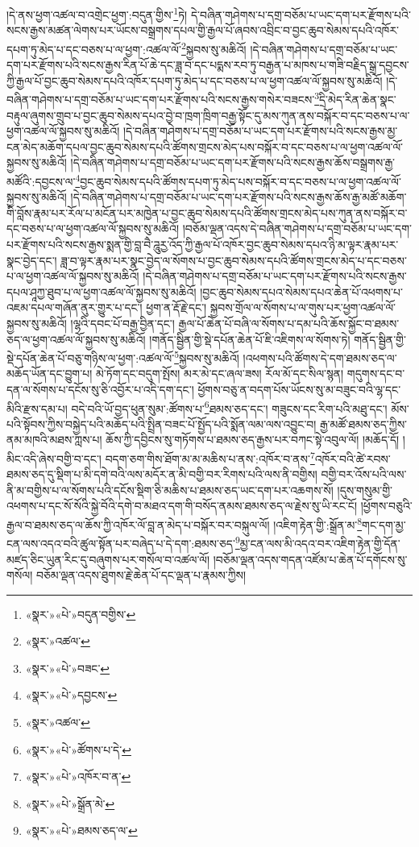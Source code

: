།དེ་ནས་ཕྱག་འཚལ་བ་འགྲེང་ཕྱག་:བདུན་གྱིས་\footnote{«སྣར་»«པེ་»བདུན་བགྱིས་}ཏེ། དེ་བཞིན་གཤེགས་པ་དགྲ་བཅོམ་པ་ཡང་དག་པར་རྫོགས་པའི་སངས་རྒྱས་མཚན་ལེགས་པར་ཡོངས་བསྒྲགས་དཔལ་གྱི་རྒྱལ་པོ་ཞབས་འབྲིང་བ་བྱང་ཆུབ་སེམས་དཔའི་འཁོར་དཔག་ཏུ་མེད་པ་དང་བཅས་པ་ལ་ཕྱག་:འཚལ་ལོ་\footnote{«སྣར་»འཚལ་}སྐྱབས་སུ་མཆིའོ། །དེ་བཞིན་གཤེགས་པ་དགྲ་བཅོམ་པ་ཡང་དག་པར་རྫོགས་པའི་སངས་རྒྱས་རིན་པོ་ཆེ་དང་ཟླ་བ་དང་པདྨས་རབ་ཏུ་བརྒྱན་པ་མཁས་པ་གཟི་བརྗིད་སྒྲ་དབྱངས་ཀྱི་རྒྱལ་པོ་བྱང་ཆུབ་སེམས་དཔའི་འཁོར་དཔག་ཏུ་མེད་པ་དང་བཅས་པ་ལ་ཕྱག་འཚལ་ལོ་སྐྱབས་སུ་མཆིའོ། །དེ་བཞིན་གཤེགས་པ་དགྲ་བཅོམ་པ་ཡང་དག་པར་རྫོགས་པའི་སངས་རྒྱས་གསེར་བཟངས་\footnote{«སྣར་»«པེ་»བཟང་}དྲི་མེད་རིན་ཆེན་སྣང་བརྟུལ་ཞུགས་གྲུབ་པ་བྱང་ཆུབ་སེམས་དཔའ་བྱེ་བ་ཁྲག་ཁྲིག་བརྒྱ་སྟོང་དུ་མས་ཀུན་ནས་བསྐོར་བ་དང་བཅས་པ་ལ་ཕྱག་འཚལ་ལོ་སྐྱབས་སུ་མཆིའོ། །དེ་བཞིན་གཤེགས་པ་དགྲ་བཅོམ་པ་ཡང་དག་པར་རྫོགས་པའི་སངས་རྒྱས་མྱ་ངན་མེད་མཆོག་དཔལ་བྱང་ཆུབ་སེམས་དཔའི་ཚོགས་གྲངས་མེད་པས་བསྐོར་བ་དང་བཅས་པ་ལ་ཕྱག་འཚལ་ལོ་སྐྱབས་སུ་མཆིའོ། །དེ་བཞིན་གཤེགས་པ་དགྲ་བཅོམ་པ་ཡང་དག་པར་རྫོགས་པའི་སངས་རྒྱས་ཆོས་བསྒྲགས་རྒྱ་མཚོའི་:དབྱངས་ལ་\footnote{«སྣར་»«པེ་»དབྱངས་}བྱང་ཆུབ་སེམས་དཔའི་ཚོགས་དཔག་ཏུ་མེད་པས་བསྐོར་བ་དང་བཅས་པ་ལ་ཕྱག་འཚལ་ལོ་སྐྱབས་སུ་མཆིའོ། །དེ་བཞིན་གཤེགས་པ་དགྲ་བཅོམ་པ་ཡང་དག་པར་རྫོགས་པའི་སངས་རྒྱས་ཆོས་རྒྱ་མཚོ་མཆོག་གི་བློས་རྣམ་པར་རོལ་པ་མངོན་པར་མཁྱེན་པ་བྱང་ཆུབ་སེམས་དཔའི་ཚོགས་གྲངས་མེད་པས་ཀུན་ནས་བསྐོར་བ་དང་བཅས་པ་ལ་ཕྱག་འཚལ་ལོ་སྐྱབས་སུ་མཆིའོ། །བཅོམ་ལྡན་འདས་དེ་བཞིན་གཤེགས་པ་དགྲ་བཅོམ་པ་ཡང་དག་པར་རྫོགས་པའི་སངས་རྒྱས་སྨན་གྱི་བླ་བཻ་ཌཱུརྱ་འོད་ཀྱི་རྒྱལ་པོ་འཁོར་བྱང་ཆུབ་སེམས་དཔའ་ཉི་མ་ལྟར་རྣམ་པར་སྣང་བྱེད་དང་། ཟླ་བ་ལྟར་རྣམ་པར་སྣང་བྱེད་ལ་སོགས་པ་བྱང་ཆུབ་སེམས་དཔའི་ཚོགས་གྲངས་མེད་པ་དང་བཅས་པ་ལ་ཕྱག་འཚལ་ལོ་སྐྱབས་སུ་མཆིའོ། །དེ་བཞིན་གཤེགས་པ་དགྲ་བཅོམ་པ་ཡང་དག་པར་རྫོགས་པའི་སངས་རྒྱས་དཔལ་ཤཱཀྱ་ཐུབ་པ་ལ་ཕྱག་འཚལ་ལོ་སྐྱབས་སུ་མཆིའོ། །བྱང་ཆུབ་སེམས་དཔའ་སེམས་དཔའ་ཆེན་པོ་འཕགས་པ་འཇམ་དཔལ་གཞོན་ནུར་གྱུར་པ་དང་། ཕྱག་ན་རྡོ་རྗེ་དང་། སྐྱབས་གྲོལ་ལ་སོགས་པ་ལ་གུས་པར་ཕྱག་འཚལ་ལོ་སྐྱབས་སུ་མཆིའོ། །ལྷའི་དབང་པོ་བརྒྱ་བྱིན་དང་། རྒྱལ་པོ་ཆེན་པོ་བཞི་ལ་སོགས་པ་དམ་པའི་ཆོས་སྐྱོང་བ་ཐམས་ཅད་ལ་ཕྱག་འཚལ་ལོ་སྐྱབས་སུ་མཆིའོ། །གནོད་སྦྱིན་གྱི་སྡེ་དཔོན་ཆེན་པོ་ཇི་འཇིགས་ལ་སོགས་ཏེ། གནོད་སྦྱིན་གྱི་སྡེ་དཔོན་ཆེན་པོ་བཅུ་གཉིས་ལ་ཕྱག་:འཚལ་ལོ་\footnote{«སྣར་»འཚལ་}སྐྱབས་སུ་མཆིའོ། །འཕགས་པའི་ཚོགས་དེ་དག་ཐམས་ཅད་ལ་མཆོད་ཡོན་དང་བྱུག་པ། མེ་ཏོག་དང་བདུག་སྤོས། མར་མེ་དང་ཞལ་ཟས། རོལ་མོ་དང་སིལ་སྙན། གདུགས་དང་བ་དན་ལ་སོགས་པ་དངོས་སུ་ཅི་འབྱོར་པ་འདི་དག་དང་། ཕྱོགས་བཅུ་ན་བདག་པོས་ཡོངས་སུ་མ་བཟུང་བའི་ལྷ་དང་མིའི་རྫས་དམ་པ། བདེ་བའི་ཡོ་བྱད་ཕུན་སུམ་:ཚོགས་པ་\footnote{«སྣར་»«པེ་»ཚོགས་པ་དེ་}ཐམས་ཅད་དང་། གཟུངས་དང་རིག་པའི་མཐུ་དང་། མོས་པའི་སྟོབས་ཀྱིས་བསྐྱེད་པའི་མཆོད་པའི་སྤྲིན་བཟང་པོ་སྤྱོད་པའི་སྨོན་ལམ་ལས་འབྱུང་བ། རྒྱ་མཚོ་ཐམས་ཅད་ཀྱིས་ནམ་མཁའི་མཐས་ཀླས་པ། ཆོས་ཀྱི་དབྱིངས་སུ་གཏོགས་པ་ཐམས་ཅད་རྒྱས་པར་བཀང་སྟེ་འབུལ་ལོ། །མཆོད་དོ། །མིང་འདི་ཞེས་བགྱི་བ་དང་། བདག་ཅག་གིས་ཐོག་མ་མ་མཆིས་པ་ནས་:འཁོར་བ་ནས་\footnote{«སྣར་»«པེ་»འཁོར་བ་ན་}འཁོར་བའི་ཚེ་རབས་ཐམས་ཅད་དུ་སྡིག་པ་མི་དགེ་བའི་ལས་མདོར་ན་མི་བགྱི་བར་རིགས་པའི་ལས་ནི་བགྱིས། བགྱི་བར་འོས་པའི་ལས་ནི་མ་བགྱིས་པ་ལ་སོགས་པའི་དངོས་སྡིག་ཅི་མཆིས་པ་ཐམས་ཅད་ཡང་དག་པར་འཆགས་སོ། །དུས་གསུམ་གྱི་འཕགས་པ་དང་སོ་སོའི་སྐྱེ་བོའི་དགེ་བ་མཐའ་དག་གི་བསོད་ནམས་ཐམས་ཅད་ལ་རྗེས་སུ་ཡི་རང་ངོ། །ཕྱོགས་བཅུའི་རྒྱལ་བ་ཐམས་ཅད་ལ་ཆོས་ཀྱི་འཁོར་ལོ་བླ་ན་མེད་པ་བསྐོར་བར་བསྐུལ་ལོ། །འཇིག་རྟེན་གྱི་:སྒྲོན་མ་\footnote{«སྣར་»«པེ་»སྒྲོན་མེ་}གང་དག་མྱ་ངན་ལས་འདའ་བའི་ཚུལ་སྟོན་པར་བཞེད་པ་དེ་དག་:ཐམས་ཅད་\footnote{«སྣར་»«པེ་»ཐམས་ཅད་ལ་}མྱ་ངན་ལས་མི་འདའ་བར་འཇིག་རྟེན་གྱི་དོན་མཛད་ཅིང་ཡུན་རིང་དུ་བཞུགས་པར་གསོལ་བ་འཚལ་ལོ། །བཅོམ་ལྡན་འདས་གདན་འཛོམ་པ་ཆེན་པོ་དགོངས་སུ་གསོལ། བཅོམ་ལྡན་འདས་ཐུགས་རྗེ་ཆེན་པོ་དང་ལྡན་པ་རྣམས་ཀྱིས། 